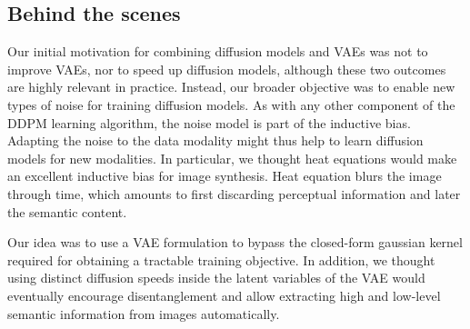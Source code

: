 %


\subsection{Behind the scenes}
Our initial motivation for combining diffusion models and VAEs was not to improve VAEs, nor to speed up diffusion models, although these two outcomes are highly relevant in practice. Instead, our broader objective was to enable new types of noise for training diffusion models. As with any other component of the DDPM learning algorithm, the noise model is part of the inductive bias. Adapting the noise to the data modality might thus help to learn diffusion models for new modalities. In particular, we thought heat equations would make an excellent inductive bias for image synthesis. Heat equation blurs the image through time, which amounts to first discarding perceptual information and later the semantic content.

Our idea was to use a VAE formulation to bypass the closed-form gaussian kernel required for obtaining a tractable training objective. In addition, we thought using distinct diffusion speeds inside the latent variables of the VAE would eventually encourage disentanglement and allow extracting high and low-level semantic information from images automatically.

